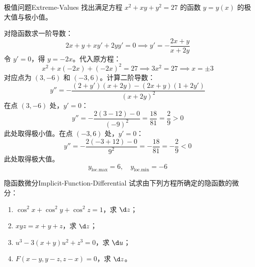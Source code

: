 \begin{problem}{极值问题}{Extreme-Values}
    找出满足方程 $x^2 + xy + y^2 = 27$ 的函数 $y = y(x)$ 的极大值与极小值。
\end{problem}

\begin{solution}
    对隐函数求一阶导数：
    \begin{equation}
        2x + y + x y' + 2y y' = 0 \implies y' = -\frac{2x + y}{x + 2y}
    \end{equation}
    令 $y' = 0$，得 $y = -2x$。代入原方程：
    \begin{equation}
        x^2 + x(-2x) + (-2x)^2 = 27 \implies 3x^2 = 27 \implies x = \pm 3
    \end{equation}
    对应点为 $(3, -6)$ 和 $(-3, 6)$。计算二阶导数：
    \begin{equation}
        y'' = -\frac{(2+y')(x+2y) - (2x+y)(1+2y')}{(x+2y)^2}
    \end{equation}
    在点 $(3, -6)$ 处，$y' = 0$：
    \begin{equation}
        y'' = -\frac{2(3 - 12) - 0}{(-9)^2} = \frac{18}{81} = \frac{2}{9} > 0
    \end{equation}
    此处取得极小值。在点 $(-3, 6)$ 处，$y' = 0$：
    \begin{equation}
        y'' = -\frac{2(-3 + 12) - 0}{9^2} = -\frac{18}{81} = -\frac{2}{9} < 0
    \end{equation}
    此处取得极大值。
    \begin{equation}
        \boxed{y_{\text{loc.max}} = 6, \quad y_{\text{loc.min}} = -6}
    \end{equation}
\end{solution}


\begin{problem}{隐函数微分}{Implicit-Function-Differential}
    试求由下列方程所确定的隐函数的微分：
    \begin{enumerate}
        \item $\cos^2 x + \cos^2 y + \cos^2 z = 1$，求 $\d z$；
        \item $xyz = x + y + z$，求 $\d z$；
        \item $u^3 - 3(x + y)u^2 + z^3 = 0$，求 $\d u$；
        \item $F(x - y, y - z, z - x) = 0$，求 $\d z$。
    \end{enumerate}
\end{problem}

